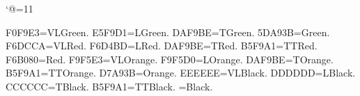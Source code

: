 \catcode`@=11\relax




\tenrm

\DefineRGBcolor F0F9E3=VLGreen.
\DefineRGBcolor E5F9D1=LGreen.
\DefineRGBcolor DAF9BE=TGreen.
\DefineRGBcolor 5DA93B=Green.
\DefineRGBcolor F6DCCA=VLRed.
\DefineRGBcolor F6D4BD=LRed.
\DefineRGBcolor DAF9BE=TRed.
\DefineRGBcolor B5F9A1=TTRed.
\DefineRGBcolor F6B080=Red.
\DefineRGBcolor F9F5E3=VLOrange.
\DefineRGBcolor F9F5D0=LOrange.
\DefineRGBcolor DAF9BE=TOrange.
\DefineRGBcolor B5F9A1=TTOrange.
\DefineRGBcolor D7A93B=Orange.
\DefineRGBcolor EEEEEE=VLBlack.
\DefineRGBcolor DDDDDD=LBlack.
\DefineRGBcolor CCCCCC=TBlack.
\DefineRGBcolor B5F9A1=TTBlack.
=Black.

%

\newcount\LD@Count@Temp


\newif\ifLD@Inferno@Master@\LD@Inferno@Master@false
\LD@Exo@Label@Hide

\LD@Colors@Hide

\def\LD@Exercice@Display@Code{}%
\gdef\LD@Exercice@Solution@List{}%
\gdef\LD@Exercice@Indication@List{}%
\gdef\LD@Exercice@Notion@List{}%
\def\LD@Exercice@Display@Code@Post{%
	\ifcsname LD@Exo@@Solution\endcsname
		\unless\ifx\LD@Exo@@Solution\LD@Empty
			\ifLD@Inferno@Master@
				\pn{\eightpts Solution : \eightpts \LD@Exo@@Solution}%
			\else
				\ifx\LD@Exercice@Solution@List\LD@Empty
					\EA\gdef\EA\LD@Exercice@Solution@List\EA{\LD@Option@@Label}%
				\else
					\EA\EA\EA\gdef\EA\EA\EA\LD@Exercice@Solution@List\EA\EA\EA{\EA\LD@Exercice@Solution@List\EA ,\LD@Option@@Label}%
				\fi
			\fi
		\fi
	\fi
	\ifcsname LD@Exo@@Notion\endcsname
		\unless\ifx\LD@Exo@@Notion\LD@Empty
			\ifLD@Inferno@Master@
				\pn{\eightpts Notions intervenant dans la solution : \eightpts \LD@Exo@@Notion}%
			\else
				\ifx\LD@Exercice@Notion@List\LD@Empty
					\EA\gdef\EA\LD@Exercice@Notion@List\EA{\LD@Option@@Label}%
				\else
					\EA\EA\EA\gdef\EA\EA\EA\LD@Exercice@Notion@List\EA\EA\EA{\EA\LD@Exercice@Notion@List\EA ,\LD@Option@@Label}%
				\fi
			\fi	
		\fi
	\fi
	\ifcsname LD@Exo@@Indication\endcsname
		\unless\ifx\LD@Exo@@Indication\LD@Empty
			\ifLD@Inferno@Master@
				\pn{\eightpts Indication : \eightpts \LD@Exo@@Indication}%
			\else
				\ifx\LD@Exercice@Indication@List\LD@Empty
					\EA\gdef\EA\LD@Exercice@Indication@List\EA{\LD@Option@@Label}%
					\else
					\EA\EA\EA\gdef\EA\EA\EA\LD@Exercice@Indication@List\EA\EA\EA{\EA\LD@Exercice@Indication@List\EA ,\LD@Option@@Label}%
				\fi
			\fi
		\fi
	\fi
	\medskip\penalty-100
}%
\def\LD@Display#1{%
	\LD@Count@Temp=#1\relax
	\ifcase\LD@Count@Temp
	\or
	Math. Sup.
	\or
	Math. Spé
	\else
	\fi
}%

